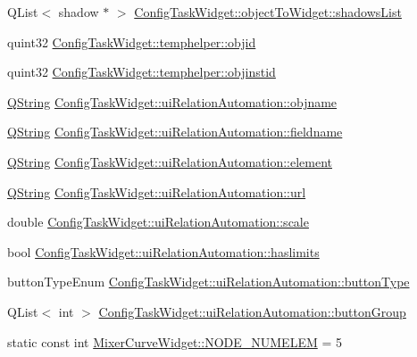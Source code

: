 \begin{DoxyCompactItemize}
\item 
\-Q\-List$<$ shadow $\ast$ $>$ \hyperlink{group___u_a_v_object_widget_utils_ga720684f6824db0612bacf1e3769c4ef3}{\-Config\-Task\-Widget\-::object\-To\-Widget\-::shadows\-List}
\item 
quint32 \hyperlink{group___u_a_v_object_widget_utils_ga4c750b1bce138cf6e002f73fca580c4d}{\-Config\-Task\-Widget\-::temphelper\-::objid}
\item 
quint32 \hyperlink{group___u_a_v_object_widget_utils_ga80a5419befd7432330b2ffb95368f4ed}{\-Config\-Task\-Widget\-::temphelper\-::objinstid}
\item 
\hyperlink{group___u_a_v_objects_plugin_gab9d252f49c333c94a72f97ce3105a32d}{\-Q\-String} \hyperlink{group___u_a_v_object_widget_utils_ga3a6899c9cfb56d74f0bf98300a156bc7}{\-Config\-Task\-Widget\-::ui\-Relation\-Automation\-::objname}
\item 
\hyperlink{group___u_a_v_objects_plugin_gab9d252f49c333c94a72f97ce3105a32d}{\-Q\-String} \hyperlink{group___u_a_v_object_widget_utils_ga727a26d7cef842f8e7cd274117a1153d}{\-Config\-Task\-Widget\-::ui\-Relation\-Automation\-::fieldname}
\item 
\hyperlink{group___u_a_v_objects_plugin_gab9d252f49c333c94a72f97ce3105a32d}{\-Q\-String} \hyperlink{group___u_a_v_object_widget_utils_gabe7df1fc4c590dc11cc6f80698fc125c}{\-Config\-Task\-Widget\-::ui\-Relation\-Automation\-::element}
\item 
\hyperlink{group___u_a_v_objects_plugin_gab9d252f49c333c94a72f97ce3105a32d}{\-Q\-String} \hyperlink{group___u_a_v_object_widget_utils_ga14b83b3a1113a21d03ee1b3e8967b7e7}{\-Config\-Task\-Widget\-::ui\-Relation\-Automation\-::url}
\item 
double \hyperlink{group___u_a_v_object_widget_utils_gafddb00770c074c3ce12d1699813a4d30}{\-Config\-Task\-Widget\-::ui\-Relation\-Automation\-::scale}
\item 
bool \hyperlink{group___u_a_v_object_widget_utils_ga73f9beb614502506b14c6b5d235b9d44}{\-Config\-Task\-Widget\-::ui\-Relation\-Automation\-::haslimits}
\item 
button\-Type\-Enum \hyperlink{group___u_a_v_object_widget_utils_gac8fcf738efe2855fbf1c7a810a20cffd}{\-Config\-Task\-Widget\-::ui\-Relation\-Automation\-::button\-Type}
\item 
\-Q\-List$<$ int $>$ \hyperlink{group___u_a_v_object_widget_utils_ga915cb6bdf9aff1b607f8917b6f665fbd}{\-Config\-Task\-Widget\-::ui\-Relation\-Automation\-::button\-Group}
\item 
static const int \hyperlink{group___u_a_v_object_widget_utils_ga359d5a2efb6966cba1d78bbdb2e7759d}{\-Mixer\-Curve\-Widget\-::\-N\-O\-D\-E\-\_\-\-N\-U\-M\-E\-L\-E\-M} = 5
\end{DoxyCompactItemize}
